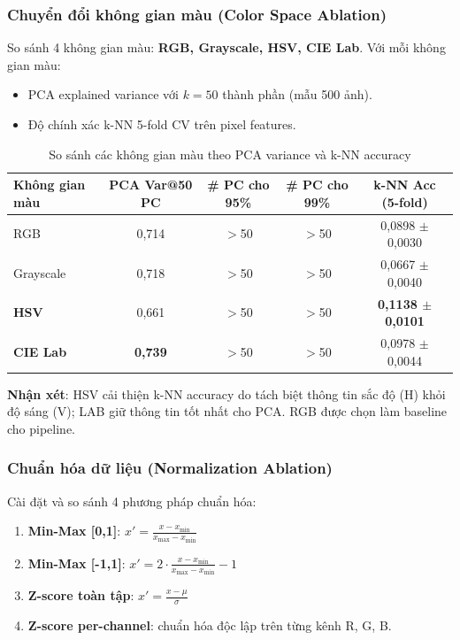 \documentclass[12pt,a4paper]{article}
\let\oldtextbf\textbf
\renewcommand{\textbf}[1]{\oldtextbf{\textcolor{hcmublue}{#1}}}
\begin{document}
\subsubsection{Chuyển đổi không gian màu (Color Space Ablation)}

So sánh 4 không gian màu: \textbf{RGB, Grayscale, HSV, CIE Lab}. Với mỗi không gian màu:
\begin{itemize}
    \item PCA explained variance với $k = 50$ thành phần (mẫu 500 ảnh).
    \item Độ chính xác k-NN 5-fold CV trên pixel features.
\end{itemize}

\begin{table}[H]
\centering
\begin{tabular}{|l|c|c|c|c|}
\hline
\textbf{Không gian màu} & \textbf{PCA Var@50 PC} & \textbf{\# PC cho 95\%} & \textbf{\# PC cho 99\%} & \textbf{k-NN Acc (5-fold)} \\ \hline
RGB            & 0{,}714 & $>$50 & $>$50 & 0{,}0898 $\pm$ 0{,}0030 \\ \hline
Grayscale      & 0{,}718 & $>$50 & $>$50 & 0{,}0667 $\pm$ 0{,}0040 \\ \hline
\textbf{HSV}   & 0{,}661 & $>$50 & $>$50 & \textbf{0{,}1138 $\pm$ 0{,}0101} \\ \hline
\textbf{CIE Lab} & \textbf{0{,}739} & $>$50 & $>$50 & 0{,}0978 $\pm$ 0{,}0044 \\ \hline
\end{tabular}
\caption{So sánh các không gian màu theo PCA variance và k-NN accuracy}
\label{tab:colorspace}
\end{table}

\textbf{Nhận xét}: HSV cải thiện k-NN accuracy do tách biệt thông tin sắc độ (H) khỏi độ sáng (V); LAB giữ thông tin tốt nhất cho PCA. RGB được chọn làm baseline cho pipeline.

\subsubsection{Chuẩn hóa dữ liệu (Normalization Ablation)}

Cài đặt và so sánh 4 phương pháp chuẩn hóa:
\begin{enumerate}
    \item \textbf{Min-Max [0,1]}: $x' = \frac{x - x_{\min}}{x_{\max} - x_{\min}}$
    \item \textbf{Min-Max [-1,1]}: $x' = 2\cdot\frac{x - x_{\min}}{x_{\max} - x_{\min}} - 1$
    \item \textbf{Z-score toàn tập}: $x' = \frac{x - \mu}{\sigma}$
    \item \textbf{Z-score per-channel}: chuẩn hóa độc lập trên từng kênh R, G, B.
\end{enumerate}
\end{document}
